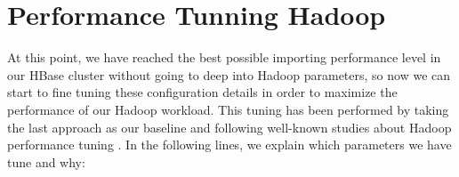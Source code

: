 

\section{Performance Tunning Hadoop}

At this point, we have reached the best possible importing performance level in our HBase cluster without going to deep into Hadoop parameters, so now we can start to fine tuning these configuration details in order to maximize the performance of our Hadoop workload. This tuning has been performed by taking the last approach as our baseline and following well-known studies about Hadoop performance tuning \cite{babu2010towards} \cite{heger2013hadoop}. In the following lines, we explain which parameters we have tune and why:

